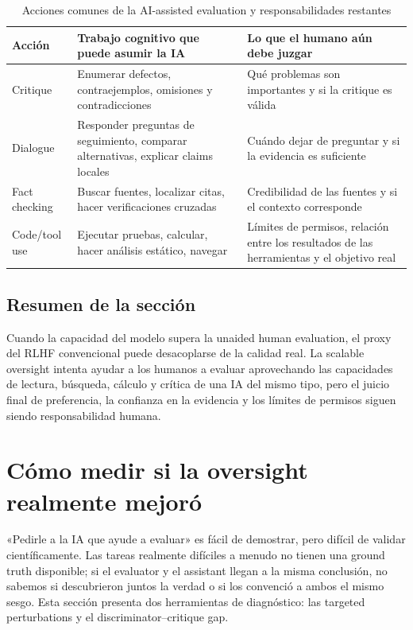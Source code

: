 \documentclass[a4paper]{article}
\begin{document}
\begin{table}[H]
\centering
\caption{Acciones comunes de la AI-assisted evaluation y responsabilidades restantes}
\begin{tabularx}{\textwidth}{L{2.6cm} X X}
\toprule
Acción & Trabajo cognitivo que puede asumir la IA & Lo que el humano aún debe juzgar \\
\midrule
Critique & Enumerar defectos, contraejemplos, omisiones y contradicciones & Qué problemas son importantes y si la critique es válida \\
Dialogue & Responder preguntas de seguimiento, comparar alternativas, explicar claims locales & Cuándo dejar de preguntar y si la evidencia es suficiente \\
Fact checking & Buscar fuentes, localizar citas, hacer verificaciones cruzadas & Credibilidad de las fuentes y si el contexto corresponde \\
Code/tool use & Ejecutar pruebas, calcular, hacer análisis estático, navegar & Límites de permisos, relación entre los resultados de las herramientas y el objetivo real \\
\bottomrule
\end{tabularx}
\end{table}

\subsection{Resumen de la sección}

Cuando la capacidad del modelo supera la unaided human evaluation, el proxy del RLHF convencional puede desacoplarse de la calidad real. La scalable oversight intenta ayudar a los humanos a evaluar aprovechando las capacidades de lectura, búsqueda, cálculo y crítica de una IA del mismo tipo, pero el juicio final de preferencia, la confianza en la evidencia y los límites de permisos siguen siendo responsabilidad humana.
\section{Cómo medir si la oversight realmente mejoró}

«Pedirle a la IA que ayude a evaluar» es fácil de demostrar, pero difícil de validar científicamente. Las tareas realmente difíciles a menudo no tienen una ground truth disponible; si el evaluator y el assistant llegan a la misma conclusión, no sabemos si descubrieron juntos la verdad o si los convenció a ambos el mismo sesgo. Esta sección presenta dos herramientas de diagnóstico: las targeted perturbations y el discriminator--critique gap.
\end{document}

